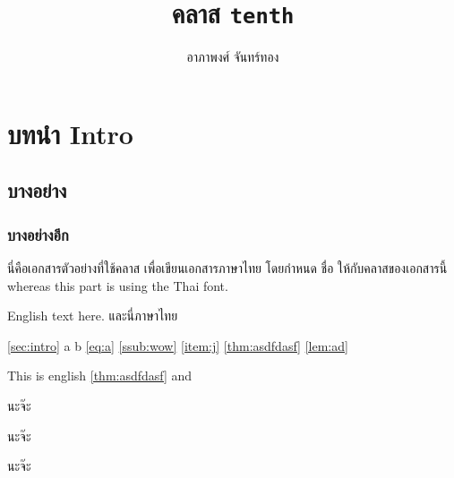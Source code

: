 \usepackage{lipsum}
\title{คลาส \texttt{tenth}}
\author{อาภา{\wbr}พงศ์ จันทร์{\wbr}ทอง}

\newrobustcmd{\codehl}{\texttt}


    \maketitle

    \section{บทนำ Intro \label{sec:intro}}
    \subsection{บาง{\wbr}อย่าง}
    \subsubsection{บาง{\wbr}อย่าง{\wbr}อีก \label{ssub:wow}}

    \makeatletter

    นี่{\wbr}คือ{\wbr}เอกสาร{\wbr}ตัวอย่าง{\wbr}ที่{\wbr}ใช้{\wbr}คลาส  เพื่อ{\wbr}เขียน{\wbr}เอกสาร{\wbr}ภาษา{\wbr}ไทย โดย{\wbr}กำหนด  ชื่อ  ให้{\wbr}กับ{\wbr}คลาส{\wbr}ของ{\wbr}เอกสาร{\wbr}นี้  whereas this part is using the Thai font.

    \begin{eng}
        English text here. {\tha และ{\wbr}นี่\sffamily ภาษา{\wbr}ไทย}
    \end{eng}

    \autoref{sec:intro} a \sectionautorefname{} b \autoref{eq:a} \autoref{ssub:wow} \autoref{item:j}
    \Hfootnoteautorefname{} \AMSautorefname{} \autoref{thm:asdfdasf} \autoref{lem:ad} \lemmaautorefname{}

    { This is english \autoref{thm:asdfdasf} and \chaptername}

    \begin{theorem}
        \label{thm:asdfdasf}
        นะ{\wbr}จ๊ะ{\wbr}
    \end{theorem}
    \unskip
    \begin{lemma}
        \label{lem:ad}
        นะ{\wbr}จ๊ะ{\wbr}
    \end{lemma}

    \begin{remark}
        นะ{\wbr}จ๊ะ{\wbr}
    \end{remark}

